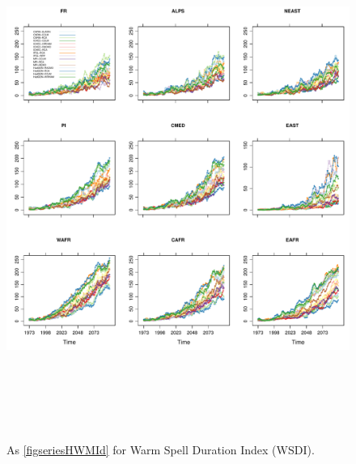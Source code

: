 \newpage
\begin{figure}
\includegraphics[height=17.0cm]{printseriesWSDI}
\caption{As \ref{figseriesHWMId} for Warm Spell Duration Index (WSDI).}
\label{figseriesWSDI}
\end{figure}


%
%



